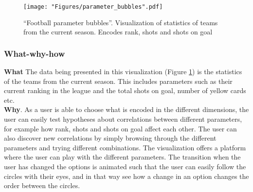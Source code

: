 \documentclass[Report.tex]{subfiles}
\begin{document}
\begin{figure}
\center
\texttt{[image: "Figures/parameter\_bubbles".pdf]}
\caption{``Football parameter bubbles''. Visualization of statistics of teams from the current season. Encodes rank, shots and shots on goal}
\label{Fig:Bubbleviz}
\end{figure}

\subsubsection{What-why-how}
\textbf{What} The data being presented in this visualization (Figure \ref{Fig:Bubbleviz}) is the statistics of the teams from the current season. This includes parameters such as their current ranking in the league and the total shots on goal, number of yellow cards etc.\\

\noindent \textbf{Why}. As a user is able to choose what is encoded in the different dimensions, the user can easily test hypotheses about correlations between different parameters, for example how rank, shots and shots on goal affect each other. The user can also discover new correlations by simply browsing through the different parameters and trying different combinations. The visualization offers a platform where the user can play with the different parameters. The transition when the user has changed the options is animated such that the user can easily follow the circles with their eyes, and in that way see how a change in an option changes the order between the circles.\\
\end{document}
